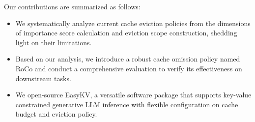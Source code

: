 Our contributions are summarized as follows:
\begin{itemize}[itemsep=1pt,parsep=2pt,topsep=1pt]
    \item We systematically analyze current cache eviction policies from the dimensions of importance score calculation and eviction scope construction, shedding light on their limitations.
    \item Based on our analysis, we introduce a robust cache omission policy named RoCo and conduct a comprehensive evaluation to verify its effectiveness on downstream tasks.
    \item We open-source EasyKV, a versatile software package that supports key-value constrained generative LLM inference with flexible configuration on cache budget and eviction policy.
\end{itemize}